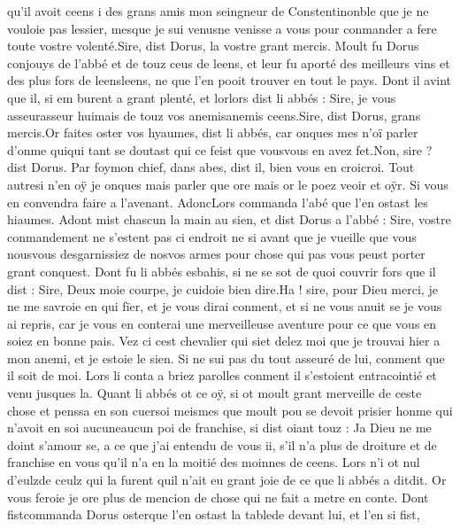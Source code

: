 \documentclass{article}
\begin{document}
\begin{pages}
      qu’il avoit ceens i des grans amis 
   mon seingneur de Constentinonble 
      que je ne vouloie pas lessier, mesque je 
      sui venusne venisse a vous pour conmander a fere toute vostre volenté.Sire, dist Dorus, la vostre grant mercis. \pend
\pstart Moult fu Dorus conjouys de l’abbé 
   et de touz ceus de leens, et leur fu aporté des meilleurs vins et des plus fors de 
   leensleens, ne que l'en pooit trouver en tout le pays. Dont il avint que il, 
   si em burent a grant plenté, et lorlors dist 
   li abbés :
   Sire, je vous asseurasseur huimais 
      de touz vos anemisanemis ceens.Sire, dist Dorus, grans mercis.Or faites oster vos hyaumes, dist li abbés, 
      car onques mes n’oï parler d’onme quiqui tant se doutast qui ce feist 
      que vousvous en avez fet.Non, sire ? dist Dorus. Par 
      foymon chief, dans abes, dist il, bien vous en 
      croicroi. Tout autresi n'en oÿ je onques mais parler que ore mais or le poez veoir
      et oÿr. Si vous en convendra faire a l'avenant.
   AdoncLors commanda l'abé que l'en ostast les hiaumes. Adont mist chascun 
   la main au sien, et dist Dorus a l’abbé :
   Sire, vostre conmandement ne s’estent pas ci endroit ne si avant 
      que je vueille que vous nousvous desgarnissiez de 
      nosvos armes pour chose qui pas vous peust porter grant conquest.
   Dont fu li abbés esbahis, si ne se sot de quoi couvrir fors que il dist :
   Sire, Deux moie courpe, je cuidoie bien dire.Ha ! sire, pour Dieu merci, je ne me savroie en qui fïer, et je vous dirai conment, 
   et si ne vous anuit se je vous ai repris, car je vous en conterai une merveilleuse aventure pour ce que vous en soiez en bonne pais. 
   Vez ci cest chevalier qui siet delez moi que je trouvai hier a mon anemi, 
   et je estoie le sien. Si ne sui pas du tout asseuré de lui, conment que il soit de moi.
   Lors li conta a briez parolles conment il s’estoient entracointié et venu jusques la. \pend
\pstart Quant li abbés 
   ot ce oÿ, si ot moult grant merveille de ceste chose 
   et penssa en son cuersoi meismes que 
   moult pou se devoit prisier honme qui n’avoit en soi 
      aucuneaucun poi de franchise, si dist oiant touz :
   Ja Dieu ne me doint s’amour se, a ce que j’ai entendu de vous ii, 
   s’il n’a plus de droiture et de franchise en vous qu’il n’a en la moitié des moinnes de ceens.
   Lors n’i ot nul d’eulzde ceulz qui la furent quil n’ait eu grant joie 
   de ce que li abbés a ditdit. Or vous feroie je
   ore plus de mencion de chose qui ne fait a metre en conte. 
   Dont fistcommanda Dorus 
   osterque l'en ostast 
   la tablede devant lui, et l'en si fist, 

\end{pages}
\end{document}
